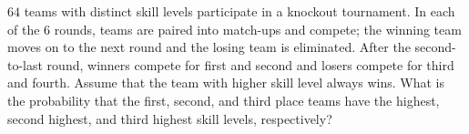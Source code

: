 $64$ teams with distinct skill levels participate in a knockout tournament. In each of the $6$ rounds, teams are paired into match-ups and compete; the winning team moves on to the next round and the losing team is eliminated. After the second-to-last round, winners compete for first and second and losers compete for third and fourth. Assume that the team with higher skill level always wins. What is the probability that the first, second, and third place teams have the highest, second highest, and third highest skill levels, respectively?